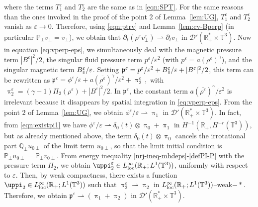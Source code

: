 \documentclass[11pt,reqno]{amsart}
\def \R{{\mathbb{R}}}
\def \Q{{\mathbb{Q}}}
\def \T{{\mathbb{T}}}
\def \P{{\mathbb{P}}}
\newcommand{\myparallel}{{\mkern3mu\vphantom{\perp}\vrule depth 0pt\mkern2mu\vrule depth 0pt\mkern3mu}}
\begin{document}
where the terms $T_1^\varepsilon$ and $T_2^\varepsilon$ are the same as in \eqref{eqn:SPT}. For the same reasons than the ones invoked in the proof of the point 2 of  Lemma~\ref{lem:UG}, $T_1^\varepsilon$ and $T_2^\varepsilon$ vanish as $\varepsilon \rightarrow 0$. Therefore, using \eqref{eqn:ptrv} and Lemma~\ref{lem:cv-Bperp} (in particular $\P_\perp v_\perp = v_\perp$), we obtain that $\partial_t(\rho^\varepsilon v_\perp^\varepsilon) \rightharpoonup \partial_t v_\perp$ in $\mathcal D'(\R_+^*\times \T^3)$. Now in equation \eqref{eq:vperp-eps}, we simultaneously deal with the magnetic pressure term $|B^\varepsilon|^2/2$, the singular fluid pressure term $ p^\varepsilon /\varepsilon^2$ (with $p^\varepsilon=a (\rho^\varepsilon)^\gamma$),  and the singular magnetic term $B_\myparallel^\varepsilon/\varepsilon$. Setting $\mathfrak p^\varepsilon = p^\varepsilon /\varepsilon^2 + B_\myparallel^\varepsilon/\varepsilon + |B^\varepsilon|^2/2$, this term can be rewritten as $ \mathfrak p^\varepsilon =\phi^\varepsilon/\varepsilon  + a (\overline{\rho^\varepsilon})^\gamma/\varepsilon^2 + \uppi_2^\varepsilon\,,$ with $\, \uppi_2^\varepsilon = (\gamma-1)\Pi_2(\rho^\varepsilon) + |B^\varepsilon|^2/2$. In $\mathfrak p^\varepsilon $, the constant term $ a (\overline{\rho^\varepsilon})^\gamma/\varepsilon^2$ is irrelevant because it disappears by spatial integration in \eqref{eq:vperp-eps}. From the point 2 of  Lemma~\ref{lem:UG}, we obtain  $\phi^\varepsilon/\varepsilon \rightharpoonup \uppi_1$ in $\mathcal D'(\R_+^* \times \T^3)$. In fact, from \eqref{eqn:existpi1} we have $\phi^\varepsilon/\varepsilon \rightharpoonup  \delta_0(t) \otimes \uppi_0  + \uppi_1 $ in $H^{-1}(\R_+, H^{-r}( \T^3))$, but as already mentioned above, the term $ \delta_0(t) \otimes \uppi_0 $ cancels the irrotational part  $\Q_\perp u_{0 \perp }$ of the limit term $u_{0 \perp }$, so that  the limit initial condition is $\P_\perp u_{0 \perp }=\P_\perp v_{0 \perp }$. From energy inequality \eqref{nrj-ineq-mhdeps}-\eqref{defPI-P} with the pressure term $\Pi_2$, we obtain  $\uppi_2^\varepsilon \in L_{\rm loc}^\infty(\R_+;L^1(\T^3))$, uniformly with respect to $\varepsilon$. Then, by weak compactness, there exists a function $\uppi_2 \in  L_{\rm loc}^\infty(\R_+;L^1(\T^3))$ such that $\uppi_2^\varepsilon \rightharpoonup \uppi_2$ in $ L_{\rm loc}^\infty(\R_+;L^1(\T^3))$--weak$-*$. Therefore, we obtain $ \mathfrak p^\varepsilon \rightharpoonup (\uppi_1 + \uppi_2)$ in $\mathcal D'(\R_+^* \times \T^3)$.
\end{document}
